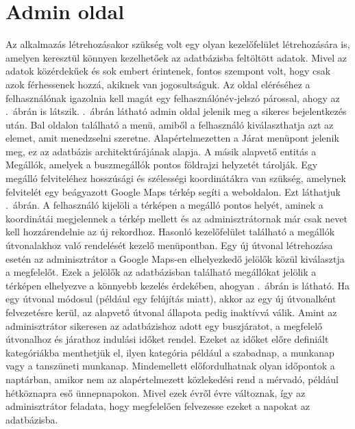 \section{Admin oldal}
\label{admin}
Az alkalmazás létrehozásakor szükség volt egy olyan kezelőfelület létrehozására is, amelyen keresztül könnyen kezelhetőek az adatbázisba feltöltött adatok.
Mivel az adatok közérdekűek és sok embert érintenek, fontos szempont volt, hogy csak azok férhessenek hozzá, akiknek van jogosultságuk.
Az oldal eléréséhez a felhasználónak igazolnia kell magát egy felhasználónév-jelszó párossal, ahogy az .\ ábrán is látszik.
.\ ábrán látható admin oldal jelenik meg a sikeres bejelentkezés után.
Bal oldalon található a menü, amiből a felhasználó kiválaszthatja azt az elemet, amit menedzselni szeretne.
Alapértelmezetten a Járat menüpont jelenik meg, ez az adatbázis architektúrájának alapja.
A másik alapvető entitás a Megállók, amelyek a buszmegállók pontos földrajzi helyzetét tárolják.
Egy megálló felviteléhez hosszúsági és szélességi koordinátákra van szükség, amelynek felvitelét egy beágyazott Google Maps térkép segíti a weboldalon.
Ezt láthatjuk .\ ábrán.
A felhasználó kijelöli a térképen a megálló pontos helyét, aminek a koordinátái megjelennek a térkép mellett és az adminisztrátornak már csak nevet kell hozzárendelnie az új rekordhoz.
Hasonló kezelőfelület található a megállók útvonalakhoz való rendelését kezelő menüpontban.
Egy új útvonal létrehozása esetén az adminisztrátor a Google Maps-en elhelyezkedő jelölők közül kiválasztja a megfelelőt.
Ezek a jelölők az adatbázisban található megállókat jelölik a térképen elhelyezve a könnyebb kezelés érdekében, ahogyan .\ ábrán is látható.
Ha egy útvonal módosul (például egy felújítás miatt), akkor az egy új útvonalként felvezetésre kerül, az alapvető útvonal állapota pedig inaktívvá válik.
Amint az adminisztrátor sikeresen az adatbázishoz adott egy buszjáratot, a megfelelő útvonalhoz és járathoz indulási időket rendel.
Ezeket az időket előre definiált kategóriákba menthetjük el, ilyen kategória például a szabadnap, a munkanap vagy a tanszüneti munkanap.
Mindemellett előfordulhatnak olyan időpontok a naptárban, amikor nem az alapértelmezett közlekedési rend a mérvadó, például hétköznapra eső ünnepnapokon.
Mivel ezek évről évre változnak, így az adminisztrátor feladata, hogy megfelelően felvezesse ezeket a napokat az adatbázisba.


